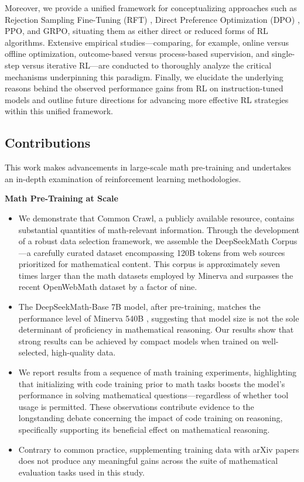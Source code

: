 Moreover, we provide a unified framework for conceptualizing approaches such as Rejection Sampling Fine-Tuning (RFT) \citep{yuan2023scaling}, Direct Preference Optimization (DPO) \citep{dpo}, PPO, and GRPO, situating them as either direct or reduced forms of RL algorithms. Extensive empirical studies—comparing, for example, online versus offline optimization, outcome-based versus process-based supervision, and single-step versus iterative RL—are conducted to thoroughly analyze the critical mechanisms underpinning this paradigm. Finally, we elucidate the underlying reasons behind the observed performance gains from RL on instruction-tuned models and outline future directions for advancing more effective RL strategies within this unified framework.

\subsection{Contributions}
This work makes advancements in large-scale math pre-training and undertakes an in-depth examination of reinforcement learning methodologies.

\textbf{Math Pre-Training at Scale}

\begin{itemize}[topsep=0pt]
    \item We demonstrate that Common Crawl, a publicly available resource, contains substantial quantities of math-relevant information. Through the development of a robust data selection framework, we assemble the DeepSeekMath Corpus—a carefully curated dataset encompassing 120B tokens from web sources prioritized for mathematical content. This corpus is approximately seven times larger than the math datasets employed by Minerva \citep{minerva} and surpasses the recent OpenWebMath dataset \citep{openwebmath} by a factor of nine.

    \item The DeepSeekMath-Base 7B model, after pre-training, matches the performance level of Minerva 540B \citep{minerva}, suggesting that model size is not the sole determinant of proficiency in mathematical reasoning. Our results show that strong results can be achieved by compact models when trained on well-selected, high-quality data.

    \item We report results from a sequence of math training experiments, highlighting that initializing with code training prior to math tasks boosts the model's performance in solving mathematical questions—regardless of whether tool usage is permitted. These observations contribute evidence to the longstanding debate concerning the impact of code training on reasoning, specifically supporting its beneficial effect on mathematical reasoning.

    \item Contrary to common practice, supplementing training data with arXiv papers does not produce any meaningful gains across the suite of mathematical evaluation tasks used in this study.
\end{itemize}

